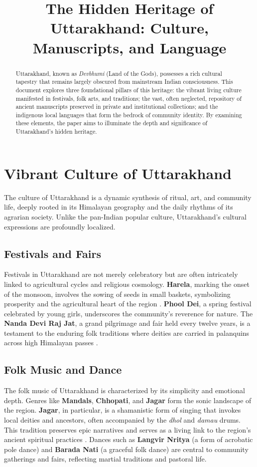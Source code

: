 \documentclass[12pt]{article}
\title{The Hidden Heritage of Uttarakhand: Culture, Manuscripts, and Language}
\author{}
\date{}
\begin{document}
\maketitle

\begin{abstract}
Uttarakhand, known as \textit{Devbhumi} (Land of the Gods), possesses a rich cultural tapestry that remains largely obscured from mainstream Indian consciousness. This document explores three foundational pillars of this heritage: the vibrant living culture manifested in festivals, folk arts, and traditions; the vast, often neglected, repository of ancient manuscripts preserved in private and institutional collections; and the indigenous local languages that form the bedrock of community identity. By examining these elements, the paper aims to illuminate the depth and significance of Uttarakhand's hidden heritage.
\end{abstract}

\section{Vibrant Culture of Uttarakhand}
The culture of Uttarakhand is a dynamic synthesis of ritual, art, and community life, deeply rooted in its Himalayan geography and the daily rhythms of its agrarian society. Unlike the pan-Indian popular culture, Uttarakhand's cultural expressions are profoundly localized.

\subsection{Festivals and Fairs}
Festivals in Uttarakhand are not merely celebratory but are often intricately linked to agricultural cycles and religious cosmology. \textbf{Harela}, marking the onset of the monsoon, involves the sowing of seeds in small baskets, symbolizing prosperity and the agricultural heart of the region \cite{joshi2020culture}. \textbf{Phool Dei}, a spring festival celebrated by young girls, underscores the community's reverence for nature. The \textbf{Nanda Devi Raj Jat}, a grand pilgrimage and fair held every twelve years, is a testament to the enduring folk traditions where deities are carried in palanquins across high Himalayan passes \cite{rawat2018folk}.

\subsection{Folk Music and Dance}
The folk music of Uttarakhand is characterized by its simplicity and emotional depth. Genres like \textbf{Mandals}, \textbf{Chhopati}, and \textbf{Jagar} form the sonic landscape of the region. \textbf{Jagar}, in particular, is a shamanistic form of singing that invokes local deities and ancestors, often accompanied by the \textit{dhol} and \textit{damau} drums. This tradition preserves epic narratives and serves as a living link to the region's ancient spiritual practices \cite{sax1991mountain}. Dances such as \textbf{Langvir Nritya} (a form of acrobatic pole dance) and \textbf{Barada Nati} (a graceful folk dance) are central to community gatherings and fairs, reflecting martial traditions and pastoral life.
\end{document}
